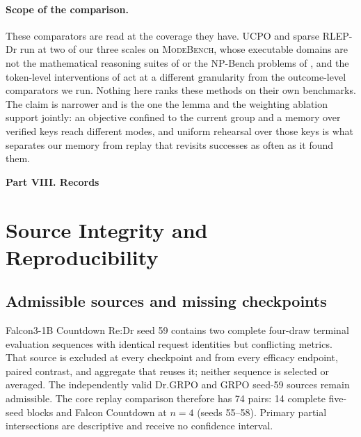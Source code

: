 \documentclass{article}
\newcommand{\1}{\mathbf 1}
\newcommand{\mb}{\textsc{ModeBench}}
\theoremstyle{remark}
\theoremstyle{definition}
\theoremstyle{plain}
\begin{document}
\paragraph{Scope of the comparison.}
These comparators are read at the coverage they have. UCPO and sparse RLEP-Dr
run at two of our three scales on \mb{}, whose executable domains are not the
mathematical reasoning suites of \citet{lochab2026ucpo} or the NP-Bench
problems of \citet{li2026distribution}, and the token-level interventions of
\citet{cui2025entropy} act at a different granularity from the outcome-level
comparators we run. Nothing here ranks these
methods on their own benchmarks. The claim is narrower and is the one the
lemma and the weighting ablation support jointly: an objective confined to the
current group and a memory over verified keys reach different modes, and
uniform rehearsal over those keys is what separates our memory from replay that
revisits successes as often as it found them.

\clearpage
{}
\begin{center}\large\textbf{Part VIII. Records}\end{center}

\section{Source Integrity and Reproducibility}
\label{app:reproducibility}

\subsection{Admissible sources and missing checkpoints}
\label{app:source-integrity}

Falcon3-1B Countdown Re:Dr seed 59 contains two complete four-draw
terminal evaluation sequences with identical request identities but
conflicting metrics. That source is excluded at every
checkpoint and from every efficacy endpoint, paired contrast, and aggregate
that reuses it; neither sequence is selected or averaged. The independently
valid Dr.GRPO and GRPO seed-59 sources remain admissible. The core replay
comparison therefore has 74 pairs: 14 complete five-seed blocks and Falcon
Countdown at $n=4$ (seeds 55--58). Primary partial intersections are
descriptive and receive no confidence interval.
\end{document}
